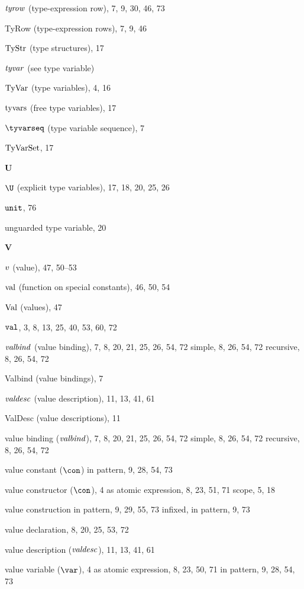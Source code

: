 \begin{theindex}
\item ${\it tyrow}$ (type-expression row), 7, 9, 30, 46, 73
\item TyRow (type-expression rows), 7, 9, 46
\item ${\rm TyStr}$ (type structures), 17
\item ${\it tyvar}$ (see type variable) 
\item ${\rm TyVar}$ (type variables), 4, 16
\item $\mathop{\rm tyvars}\nolimits$ (free type variables), 17
\item $\tyvarseq$ (type variable sequence), 7
\item ${\rm TyVarSet}$, 17
\indexspace
\parbox{65mm}{\hfil{\large\bf U}\hfil}
\indexspace
\item $\U$ (explicit type variables), 17, 18, 20, 25, 26
\item $\mbox{\tt unit}$, 76
\item unguarded type variable, 20
\indexspace
\parbox{65mm}{\hfil{\large\bf V}\hfil}
\indexspace
\item $v$ (value), 47, 50--53
\item $\mathop{\rm val}\nolimits$ (function on special constants), 46, 50, 54
\item ${\rm Val}$ (values), 47
\item ${\tt val}$, 3, 8, 13, 25, 40, 53, 60, 72
\item ${\it valbind}$ (value binding), 7, 8, 20, 21, 25, 26, 54, 72
\subitem simple, 8, 26, 54, 72
\subitem recursive, 8, 26, 54, 72
\item Valbind (value bindings), 7
\item ${\it valdesc}$ (value description), 11, 13, 41, 61
\item ValDesc (value descriptions), 11
\item value binding (${\it valbind}$), 7, 8, 20, 21, 25, 26, 54, 72
\subitem simple, 8, 26, 54, 72
\subitem recursive, 8, 26, 54, 72
\item value constant ($\con$) 
\subitem in pattern, 9, 28, 54, 73
\item value constructor ($\con$), 4
\subitem as atomic expression, 8, 23, 51, 71
\subitem scope, 5, 18
\item value construction 
\subitem in pattern, 9, 29, 55, 73
\subitem infixed, in pattern, 9, 73
\item value declaration, 8, 20, 25, 53, 72
\item value description (${\it valdesc}$), 11, 13, 41, 61
\item value variable ($\var$), 4
\subitem as atomic expression, 8, 23, 50, 71
\subitem in pattern, 9, 28, 54, 73

\end{theindex}
